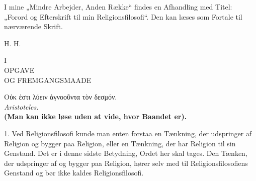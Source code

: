 \documentclass[12pt,a4paper,openany]{book}
\newcommand{\opage}[1]{\marginnote{\footnotesize\textit{[#1]}}}
\begin{document}
{\scriptsize I mine „Mindre Arbejder, Anden Række“ findes en Afhandling med
Titel: „Forord og Efterskrift til min Religionsfilosofi“. Den kan læses som
Fortale til nærværende Skrift.\par
\hfill H. H.\par}
\clearpage

\opage{1}\begin{center}I\\[6pt]OPGAVE\\ OG FREMGANGSMAADE\end{center}
\clearpage
\opage{2}\mbox{}\clearpage
\opage{3}\begin{center}\small Οὐκ ἐστι λύειν ἀγνοοῦντα τὸν δεσμόν.\\
\hfill\textit{Aristoteles.}\\
\textbf{(Man kan ikke løse uden at vide, hvor Baandet er).}\end{center}

1. Ved Religionsfilosofi kunde man enten forstaa en Tænkning, der
udspringer af Religion og bygger paa Religion, eller en Tænkning, der
har Religion til sin Genstand. Det er i denne sidste Betydning, Ordet
her skal tages. Den Tænken, der udspringer af og bygger paa Religion,
hører selv med til Religionsfilosofiens Genstand og bør ikke kaldes
Religionsfilosofi.
\end{document}
